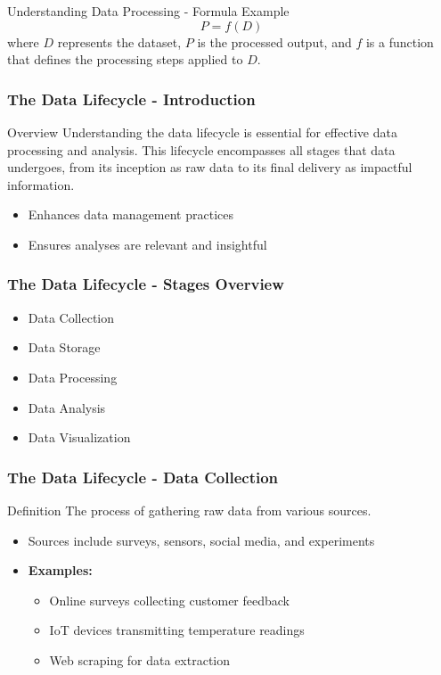 \documentclass[aspectratio=169]{beamer}
\begin{document}
\begin{frame}[fragile]{Understanding Data Processing - Formula Example}
    \begin{equation}
        P = f(D)
    \end{equation}
    where \( D \) represents the dataset, \( P \) is the processed output, and \( f \) is a function that defines the processing steps applied to \( D \).
\end{frame}

\begin{frame}[fragile]
    \frametitle{The Data Lifecycle - Introduction}
    \begin{block}{Overview}
        Understanding the data lifecycle is essential for effective data processing and analysis. 
        This lifecycle encompasses all stages that data undergoes, from its inception as raw data 
        to its final delivery as impactful information.
    \end{block}
    \begin{itemize}
        \item Enhances data management practices
        \item Ensures analyses are relevant and insightful
    \end{itemize}
\end{frame}

\begin{frame}[fragile]
    \frametitle{The Data Lifecycle - Stages Overview}
    \begin{itemize}
        \item Data Collection
        \item Data Storage
        \item Data Processing
        \item Data Analysis
        \item Data Visualization
    \end{itemize}
\end{frame}

\begin{frame}[fragile]
    \frametitle{The Data Lifecycle - Data Collection}
    \begin{block}{Definition}
        The process of gathering raw data from various sources.
    \end{block}
    \begin{itemize}
        \item Sources include surveys, sensors, social media, and experiments
        \item \textbf{Examples:}
        \begin{itemize}
            \item Online surveys collecting customer feedback
            \item IoT devices transmitting temperature readings
            \item Web scraping for data extraction
        \end{itemize}
    \end{itemize}
\end{frame}
\end{document}
